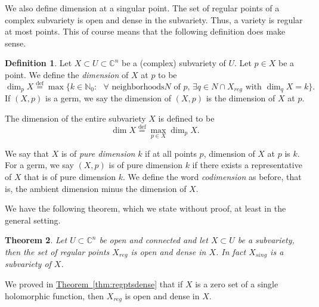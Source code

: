 \documentclass[12pt,openany]{book}
\newcommand{\C}{{\mathbb{C}}}
\newcommand{\N}{{\mathbb{N}}}
\newcommand{\myindex}[1]{#1\index{#1}}
\theoremstyle{plain}
\newtheorem{thm}{Theorem}[section]
\newtheorem{prop}[thm]{Proposition}
\theoremstyle{remark}
\theoremstyle{definition}
\newtheorem{defn}[thm]{Definition}
\theoremstyle{exercise}
\theoremstyle{example}
\newcommand{\thmref}[1]{\hyperref[#1]{Theorem~\ref*{#1}}}
\begin{document}
We also define dimension at a singular point.
The set of regular points of a complex
subvariety is open and dense in the subvariety.  Thus, a
variety is regular at most points.  This of course means that the 
following definition does make sense.

\begin{defn}
Let $X \subset U \subset \C^n$ be a (complex) subvariety of $U$.  Let $p \in
X$ be a point.  We define the \emph{\myindex{dimension}} of $X$ at $p$
to be
\begin{equation*}
\dim_p X \overset{\text{def}}{=}
\max \{ k \in \N_0 : \text{ $\forall$ neighborhoods
$N$ of $p$, $\exists q \in N \cap X_{\mathit{reg}}$ with $\dim_q X = k$} \} .
\end{equation*}
If $(X,p)$ is a germ, we say the dimension of $(X,p)$ is the dimension of
$X$ at $p$.

The dimension of the entire subvariety $X$ is defined to be
\begin{equation*}
\dim X \overset{\text{def}}{=}
\max_{p \in X} \dim_p X .
\end{equation*}

We say that $X$ is of \emph{\myindex{pure dimension}} $k$ if at
all points $p$, dimension of $X$ at $p$ is $k$.  For a germ,
we say $(X,p)$ is of pure dimension $k$ if there exists a representative
of $X$ that is of pure dimension $k$.
We define the word \emph{codimension} as before, that is, the
ambient dimension minus the dimension of $X$.
\end{defn}


We have the following theorem, which we
state without proof, at least in the general setting.

\begin{thm}
Let $U \subset \C^n$ be open and connected and let $X \subset U$
be a subvariety, then the set of regular points $X_{\mathit{reg}}$
is open and dense in $X$.
In fact $X_{\mathit{sing}}$ is a subvariety of $X$.
\end{thm}

We proved in \thmref{thm:regptsdense} that if $X$ is a zero set of a single
holomorphic function, then $X_{\mathit{reg}}$ is open and dense in $X$.
%
%
\end{document}
